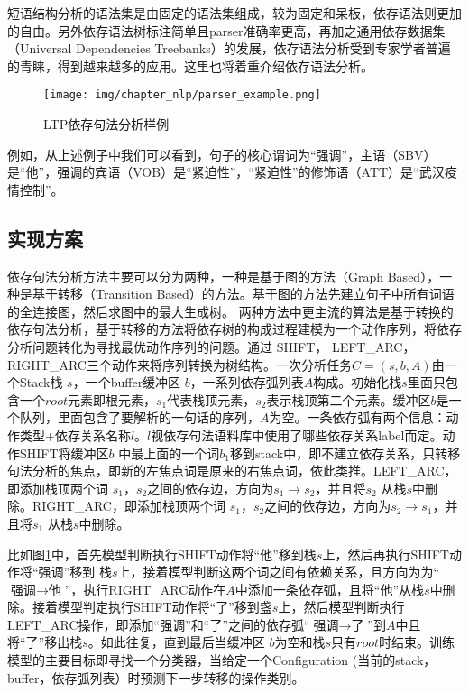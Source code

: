 短语结构分析的语法集是由固定的语法集组成，较为固定和呆板，依存语法则更加的自由。另外依存语法树标注简单且parser准确率更高，再加之通用依存数据集（Universal Dependencies Treebanks）的发展，依存语法分析受到专家学者普遍的青睐，得到越来越多的应用。这里也将着重介绍依存语法分析。

\begin{figure}[h]
\centering
\texttt{[image: img/chapter\_nlp/parser\_example.png]}
\caption{LTP依存句法分析样例}
\label{fig:parserexample}
\end{figure}
例如，从上述例子中我们可以看到，句子的核心谓词为“强调”，主语（SBV）是“他”，强调的宾语（VOB）是“紧迫性”，“紧迫性”的修饰语（ATT）是“武汉疫情控制”。


\subsection{实现方案}
依存句法分析方法主要可以分为两种，一种是基于图的方法（Graph Based），一种是基于转移（Transition Based）的方法。基于图的方法先建立句子中所有词语的全连接图，然后求图中的最大生成树。 两种方法中更主流的算法是基于转换的依存句法分析，基于转移的方法将依存树的构成过程建模为一个动作序列，将依存分析问题转化为寻找最优动作序列的问题。通过 SHIFT， LEFT\_ARC， RIGHT\_ARC三个动作来将序列转换为树结构。一次分析任务$C = (s, b, A)$由一个Stack栈 $s$，一个buffer缓冲区 $b$，一系列依存弧列表$A$构成。初始化栈$s$里面只包含一个$root$元素即根元素，$s_1$代表栈顶元素，$s_2$表示栈顶第二个元素。缓冲区$b$是一个队列，里面包含了要解析的一句话的序列，$A$为空。一条依存弧有两个信息：动作类型+依存关系名称$l$。$l$视依存句法语料库中使用了哪些依存关系label而定。动作SHIFT将缓冲区$b$ 中最上面的一个词$b_1$移到stack中，即不建立依存关系，只转移句法分析的焦点，即新的左焦点词是原来的右焦点词，依此类推。LEFT\_ARC，即添加栈顶两个词 $s_1$，$s_2$之间的依存边，方向为$s_1 \rightarrow s_2$，并且将$s_2$ 从栈$s$中删除。RIGHT\_ARC，即添加栈顶两个词 $s_1$，$s_2$之间的依存边，方向为$s_2 \rightarrow s_1$，并且将$s_1$ 从栈$s$中删除。

比如图\ref{fig:parserexample}中，首先模型判断执行SHIFT动作将“他”移到栈$s$上，然后再执行SHIFT动作将“强调”移到 栈$s$上，接着模型判断这两个词之间有依赖关系，且方向为为“$\text{强调} \rightarrow \text{他}$”，执行RIGHT\_ARC动作在$A$中添加一条依存弧，且将“他”从栈$s$中删除。接着模型判定执行SHIFT动作将“了”移到盏$s$上，然后模型判断执行LEFT\_ARC操作，即添加“强调”和“了”之间的依存弧“$\text{强调} \rightarrow \text{了}$”到$A$中且将“了”移出栈$s$。如此往复，直到最后当缓冲区 $b$为空和栈$s$只有$root$时结束。训练模型的主要目标即寻找一个分类器，当给定一个Configuration (当前的stack，buffer，依存弧列表）时预测下一步转移的操作类别。

